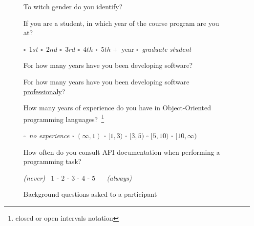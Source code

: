 \begin{figure}[h!]
\begin{mdframed}[backgroundcolor=gray!15] 
\begin{scriptsize}

\noindent To witch gender do you identify? 

\medskip

\noindent If you are a student, in which year of the course program are you at?  \smallskip

\quad $\square$~$1st$  
\quad $\square$~$2nd$  
\quad $\square$~$3rd$  
\quad $\square$~$4th$  
\quad $\square$~$5th+$ year 
\quad $\square$~\textit{graduate student} 

\medskip

\noindent For how many years have you been developing software?  

\medskip

\noindent For how many years have you been developing software \underline{professionaly}? 

\medskip

\noindent How many years of experience do you have in Object-Oriented programming languages?~\footnote{\scriptsize closed or open intervals notation} \smallskip

\quad $\square$~\textit{no experience} 
\quad $\square$ $(\infty, 1)$
\quad $\square$ $[1, 3)$
\quad $\square$ $[3, 5)$
\quad $\square$ $[5, 10)$
\quad $\square$ $[10, \infty)$

\medskip

\noindent How often do you consult API documentation when performing a programming task?  \smallskip

\quad \textit{(never)} ~$1$ - $2$ - $3$ - $4$ - $5$ ~ ~\textit{(always)} 

\end{scriptsize}
\end{mdframed}
\caption{Background questions asked to a participant}
\label{fig:experiment-demographics}
\end{figure}

    
